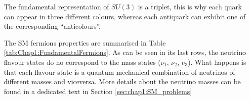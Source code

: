 The fundamental representation of $SU(3)$ is a triplet, this is why each quark can appear in three different colours, whereas each antiquark can exhibit one of the corresponding ``anticolours''. 




The SM fermions properties are summarised in Table \ref{tab:Chap1:FundamentalFermions}. As can be seen in its last rows, the neutrino flavour states do no correspond to 
the mass states ($\nu_{1}$, $\nu_{2}$, $\nu_{3}$). What happens is that each flavour state is a quantum mechanical combination of neutrinos of different masses and viceversa.
More details about the neutrino masses can be found in a dedicated text in Section \ref{sec:chap1:SM_problems}

